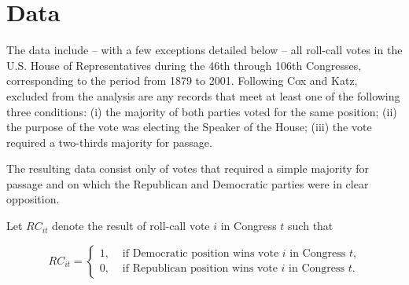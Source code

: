 \section{Data}

The data include -- with a few exceptions detailed below -- all roll-call votes in the U.S. House of Representatives during the 46th through 106th Congresses, corresponding to the period from 1879 to 2001.  Following Cox and Katz, excluded from the analysis are any records that meet at least one of the following three conditions: (i) the majority of both parties voted for the same position; (ii) the purpose of the vote was electing the Speaker of the House; (iii) the vote required a two-thirds majority for passage.

The resulting data consist only of votes that required a simple majority for passage and on which the Republican and Democratic parties were in clear opposition. 

Let $RC_{it}$ denote the result of roll-call vote $i$ in Congress $t$ such that 

\begin{equation*}
RC_{it} =
\begin{cases} 
1, & \text{ if Democratic position wins vote $i$ in Congress $t$,} \\
0, & \text{ if Republican position wins vote $i$ in Congress $t$.}
\end{cases}
\end{equation*}


